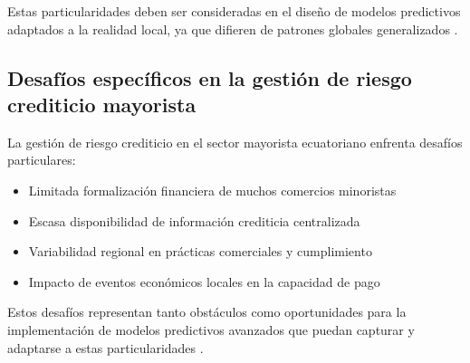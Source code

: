 Estas particularidades deben ser consideradas en el diseño de modelos predictivos adaptados a la realidad local, ya que difieren de patrones globales generalizados \cite{ramirez2023predictive}.

\subsection{Desafíos específicos en la gestión de riesgo crediticio mayorista}
La gestión de riesgo crediticio en el sector mayorista ecuatoriano enfrenta desafíos particulares:

\begin{itemize}
    \item Limitada formalización financiera de muchos comercios minoristas
    \item Escasa disponibilidad de información crediticia centralizada
    \item Variabilidad regional en prácticas comerciales y cumplimiento
    \item Impacto de eventos económicos locales en la capacidad de pago
\end{itemize}

Estos desafíos representan tanto obstáculos como oportunidades para la implementación de modelos predictivos avanzados que puedan capturar y adaptarse a estas particularidades \cite{torres2023inteligencia}.
